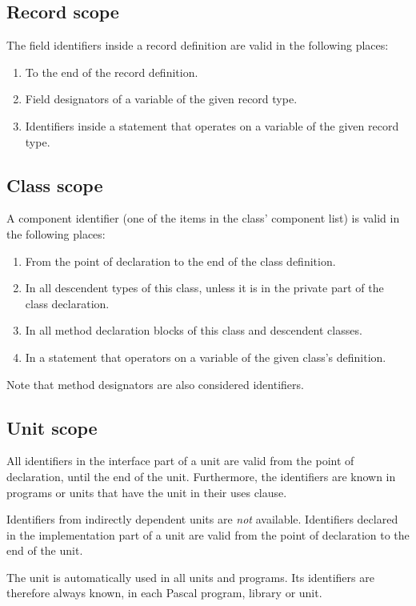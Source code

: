 \subsection{Record scope}
The field identifiers inside a record definition are valid in the following
places:
\begin{enumerate}
\item To the end of the record definition.
\item Field designators of a variable of the given record type.
\item Identifiers inside a  statement that operates on a variable
of the given record type.
\end{enumerate}

\subsection{Class scope}
A component identifier (one of the items in the class' component list)
is valid in the following places:
\begin{enumerate}
\item From the point of declaration to the end of the class definition.
\item In all descendent types of this class, unless it is in the private
part of the class declaration.
\item In all method declaration blocks of this class and descendent classes.
\item In a  statement that operators on a variable of the given class's
definition.
\end{enumerate}
Note that method designators are also considered identifiers.

\subsection{Unit scope}
All identifiers in the interface part of a unit are valid from the point of
declaration, until the end of the unit. Furthermore, the identifiers are
known in programs or units that have the unit in their uses clause.

Identifiers from indirectly dependent units are {\em not} available.
Identifiers declared in the implementation part of a unit are valid from the
point of declaration to the end of the unit.

The  unit is automatically used in all units and programs.
Its identifiers are therefore always known, in each Pascal program, library
or unit.

